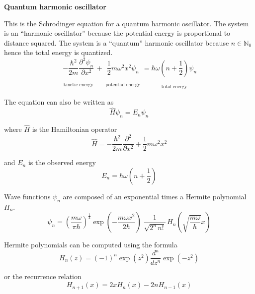 \documentclass[12pt]{article}
\begin{document}
\noindent
{\bf Quantum harmonic oscillator}

\bigskip
\noindent
This is the Schrodinger equation for a quantum harmonic oscillator.
The system is an ``harmonic oscillator'' because the potential energy is proportional to distance squared.
The system is a ``quantum'' harmonic oscillator because $n\in\mathbb{N}_0$ hence the total energy is quantized.
\begin{equation*}
\underset{\substack{\phantom{X} \\ \text{kinetic energy}}}
  {-\frac{\hbar^2}{2m}\frac{\partial^2\psi_n}{\partial x^2}}
+
\underset{\substack{\phantom{X} \\ \text{potential energy}}}
  {\frac{1}{2}m\omega^2 x^2\psi_n}
=
\underset{\substack{\phantom{X} \\ \text{total energy}}}
  {\hbar\omega\left(n+\frac{1}{2}\right)\psi_n}
\end{equation*}

\noindent
The equation can also be written as
\begin{equation*}
\hat{H}\psi_n=E_n\psi_n
\end{equation*}

\noindent
where $\hat{H}$ is the Hamiltonian operator
\begin{equation*}
\hat{H}=-\frac{\hbar^2}{2m}\frac{\partial^2}{\partial x^2}
+\frac{1}{2}m\omega^2 x^2
\end{equation*}

\noindent
and $E_n$ is the observed energy
\begin{equation*}
E_n=\hbar\omega\left(n+\frac{1}{2}\right)
\end{equation*}

\noindent
Wave functions $\psi_n$ are composed of an exponential times a Hermite polynomial $H_n$.
\begin{equation*}
\psi_n=\left(\frac{m\omega}{\pi\hbar}\right)^\frac{1}{4}
\exp\left(-\frac{m\omega x^2}{2\hbar}\right)
\;
\frac{1}{\sqrt{2^n\,n!}}\,
H_n\left(\sqrt{\frac{m\omega}{\hbar}} x\right)
\end{equation*}

\noindent
Hermite polynomials can be computed using the formula
\begin{equation*}
H_n(z)=(-1)^n\exp(z^2)\frac{d^n}{dz^n}\exp(-z^2)
\end{equation*}

\noindent
or the recurrence relation
\begin{equation*}
H_{n+1}(x)=2xH_n(x)-2nH_{n-1}(x)
\end{equation*}
\end{document}
